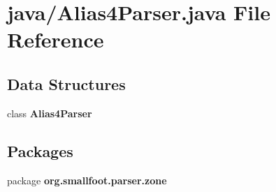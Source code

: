 \section{java/\+Alias4\+Parser.java File Reference}
\label{Alias4Parser_8java}
\subsection*{Data Structures}
\begin{DoxyCompactItemize}
\item 
class {\bf Alias4\+Parser}
\end{DoxyCompactItemize}
\subsection*{Packages}
\begin{DoxyCompactItemize}
\item 
package {\bf org.\+smallfoot.\+parser.\+zone}
\end{DoxyCompactItemize}
